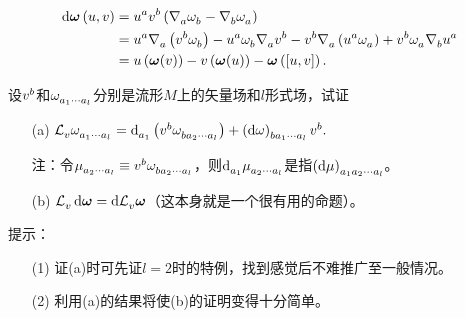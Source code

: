 \begin{xiti}
	\begin{zm}
		\begin{align*}
		\dd{\bm{\omega}} (u,v) &= \tensor{u}{^a} \tensor{v}{^b} \left( \Nabla{a} \tensor{\omega}{_b} - \Nabla{b} \tensor{\omega}{_a} \right)\\
		&= \tensor{u}{^a} \Nabla{a} \left( \tensor{v}{^b} \tensor{\omega}{_b} \right) - \tensor{u}{^a} \tensor{\omega}{_b} \Nabla{a} \tensor{v}{^b} - \tensor{v}{^b} \Nabla{a} \left( \tensor{u}{^a} \tensor{\omega}{_a} \right) + \tensor{v}{^b} \tensor{\omega}{_a} \Nabla{b} \tensor{u}{^a}\\
		&= u\left( \bm{\omega} (v) \right) - v \left( \bm{\omega} (u) \right) - \bm{\omega} \left( [u,v] \right).
		\end{align*}
	\end{zm}

	\item 设$\tensor{v}{^b} $和$\tensor{\omega}{_{a_1 \cdots a_l}} $分别是流形$M$上的矢量场和$l$形式场，试证
	\begin{enumerate}
		\item[(a)] \hypertarget{5.6.a}{}$\Ld{v} \tensor{\omega}{_{a_1 \cdots a_l}} = \dd\indices{_{a_1}} \left( \tensor{v}{^b} \tensor{\omega}{_{ba_2 \cdots a_l}} \right) + \tensor{\left( \dd{\omega} \right)}{_{ba_1 \cdots a_l}} \tensor{v}{^b}. $

		注：令$\tensor{\mu}{_{a_2 \cdots a_l}} \equiv \tensor{v}{^b} \tensor{\omega}{_{ba_2 \cdots a_l}} $，则$\dd\indices{_{a_1}} \tensor{\mu}{_{a_2 \cdots a_l}} $是指$\tensor{\left(\dd{\mu}\right)}{_{a_1 a_2 \cdots a_l }} $。
		\item[(b)] $\Ld{v} \dd{\boldsymbol{\omega}} = \dd{\Ld{v}\boldsymbol{\omega}} $（这本身就是一个很有用的命题）。
	\end{enumerate}

    提示：
    \begin{enumerate}
    	\item[(1)] 证(a)时可先证$l=2$时的特例，找到感觉后不难推广至一般情况。
    	\item[(2)] 利用(a)的结果将使(b)的证明变得十分简单。
    \end{enumerate}


\end{xiti}
